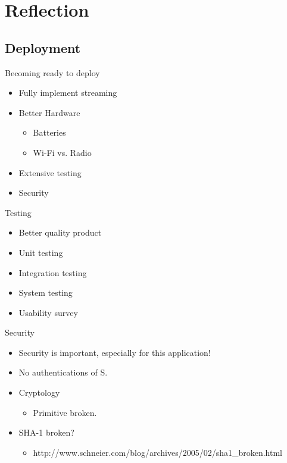 

\author{Rasmus Steiniche}
\section{Reflection}

\subsection{Deployment}
\begin{frame}{Becoming ready to deploy}
\begin{itemize}
	\item Fully implement streaming
	\item Better Hardware
	\begin{itemize}
		\item Batteries
		\item Wi-Fi vs. Radio
	\end{itemize}
	\item Extensive testing
	\item Security
\end{itemize}
\end{frame}

\begin{frame}{Testing}
\begin{itemize}
	\item Better quality product
	\item Unit testing
	\item Integration testing
	\item System testing
	\item Usability survey
\end{itemize}
\end{frame}

\begin{frame}{Security}
\begin{itemize}
	\item Security is important, especially for this application!
	\item No authentications of S.
	\item Cryptology
	\begin{itemize}
		\item Primitive broken.
	\end{itemize}
	\item SHA-1 broken?
	\begin{itemize}
		\item \tiny{http://www.schneier.com/blog/archives/2005/02/sha1\_broken.html}
	\end{itemize}
\end{itemize}
\end{frame}

